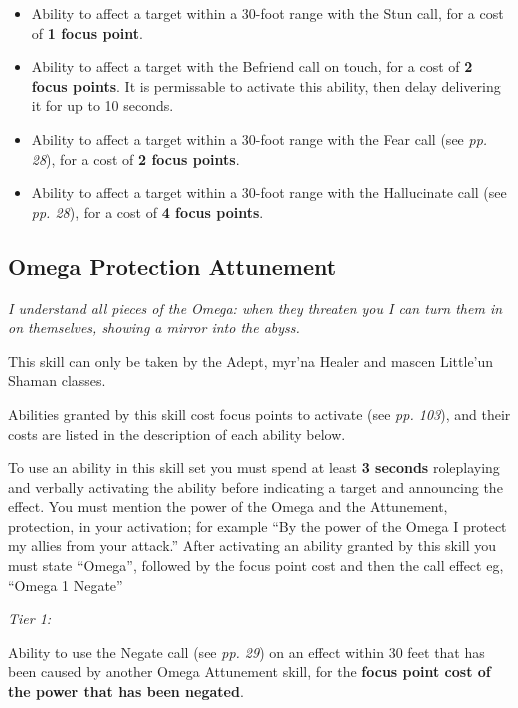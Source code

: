 \documentclass{scrbook}
\begin{document}
\begin{itemize}
\item Ability to affect a target within a 30-foot range with the Stun call, for a cost of \textbf{1 focus point}.

\item Ability to affect a target with the Befriend call on touch, for a cost of \textbf{2 focus points}. It is permissable to activate this ability, then delay delivering it for up to 10 seconds.

\item Ability to affect a target within a 30-foot range with the Fear call (see \textit{pp. 28}), for a cost of \textbf{2 focus points}.

\item Ability to affect a target within a 30-foot range with the Hallucinate call (see \textit{pp. 28}), for a cost of \textbf{4 focus points}.

\end{itemize}
\subsection{Omega Protection Attunement}

\textit{I understand all pieces of the Omega: when they threaten you I can turn them in on themselves, showing a mirror into the abyss.}

This skill can only be taken by the Adept, myr'na Healer and mascen Little'un Shaman classes.

Abilities granted by this skill cost focus points to activate (see \textit{pp. 103}), and their costs are listed in the description of each ability below.

To use an ability in this skill set you must spend at least \textbf{3 seconds} roleplaying and verbally activating the ability before indicating a target and announcing the effect. You must mention the power of the Omega and the Attunement, protection, in your activation; for example ``By the power of the Omega I protect my allies from your attack.'' After activating an ability granted by this skill you must state ``Omega'', followed by the focus point cost and then the call effect eg, ``Omega 1 Negate''

\textit{Tier 1:}

Ability to use the Negate call (see \textit{pp. 29}) on an effect within 30 feet that has been caused by another Omega Attunement skill, for the \textbf{focus point cost of the power that has been negated}.
\end{document}

